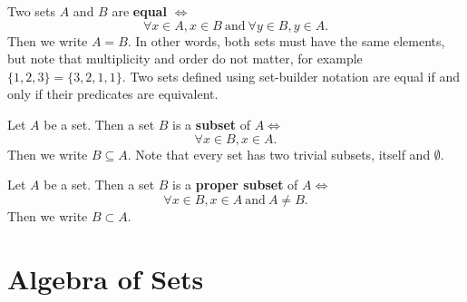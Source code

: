 \documentclass[../real_analysis.tex]{subfiles}
\begin{document}
        \begin{definition}
            Two sets $A$ and $B$ are \textbf{equal} $\iff$
            \[\forall x \in A, x \in B\ \text{and}\ \forall y \in B, y \in A.\]
            Then we write $A = B$. In other words, both sets must have the same elements, but note that multiplicity and order do not matter, for example $\{1, 2, 3\} = \{3, 2, 1, 1\}$. Two sets defined using set-builder notation are equal if and only if their predicates are equivalent.
        \end{definition}
        \begin{definition}
            Let $A$ be a set. Then a set $B$ is a \textbf{subset} of $A \iff$
            \[\forall x \in B, x \in A.\]
            Then we write $B \subseteq A$. Note that every set has two trivial subsets, itself and $\emptyset$.
        \end{definition}
        \begin{definition}
            Let $A$ be a set. Then a set $B$ is a \textbf{proper subset} of $A \iff$
            \[\forall x \in B, x \in A\ \text{and}\ A \neq B.\]
            Then we write $B \subset A$.
        \end{definition}

    \section{Algebra of Sets}
\end{document}

